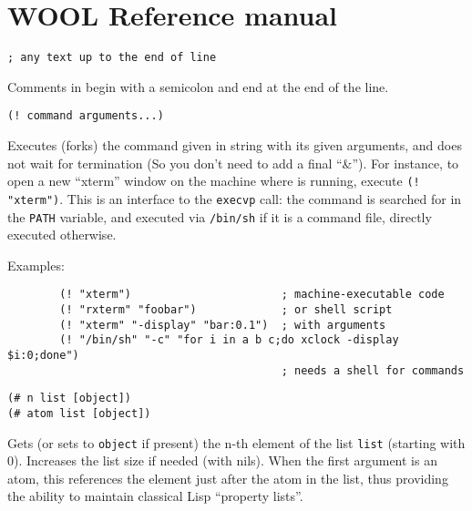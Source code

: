 \chapter{WOOL Reference manual}
\sloppy


{\usagefont\begin{verbatim}
; any text up to the end of line
\end{verbatim}}\usageupspace

Comments in {\WOOL} begin with a semicolon and end at the end
of the line.


{\usagefont\begin{verbatim} 
(! command arguments...)
\end{verbatim}}\usageupspace 

Executes (forks) the  command given in string with its given arguments, and
does not wait for termination (So you don't need to add a  final ``\&''). For
instance, to open a new ``xterm'' window on the machine where {\GWM} is
running, execute \verb|(! "xterm")|. This is an interface to the
\verb"execvp" call: the command is searched for in the \verb"PATH" variable,
and executed via \verb"/bin/sh" if it is a command file, directly executed
otherwise.

{Examples:\exemplefont\upspace\begin{verbatim}
        (! "xterm")                       ; machine-executable code
        (! "rxterm" "foobar")             ; or shell script
        (! "xterm" "-display" "bar:0.1")  ; with arguments
        (! "/bin/sh" "-c" "for i in a b c;do xclock -display $i:0;done")
                                          ; needs a shell for commands
\end{verbatim}}


{\usagefont\begin{verbatim}
(# n list [object])
(# atom list [object])
\end{verbatim}}\usageupspace

Gets (or sets to \verb"object" if present) the n-th element of the list
\verb"list" (starting with 0). Increases the list size if needed (with
nils).  When    the first argument is an atom, this references the element
just after the atom in the list, thus providing the ability to maintain
classical Lisp ``property lists''.

